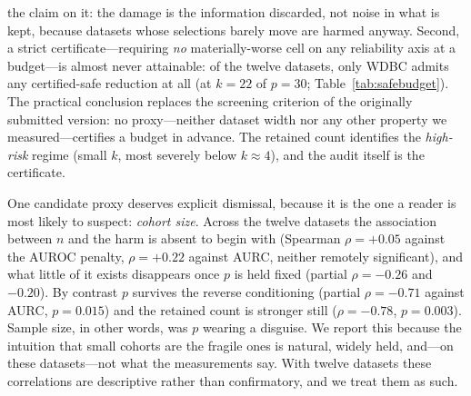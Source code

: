 \documentclass[fleqn,10pt]{wlscirep}
\newcommand{\result}[1]{#1}
\begin{document}
the claim on it: the damage is the information discarded, not noise in what is kept, because
datasets whose selections barely move are harmed anyway.
Second, a strict certificate---requiring \emph{no} materially-worse cell on any reliability axis at a
budget---is almost never attainable: of the twelve datasets, only WDBC admits any certified-safe
reduction at all (at $k=22$ of $p=30$; Table~\ref{tab:safebudget}). The practical conclusion
replaces the screening criterion of the originally submitted version: no proxy---neither dataset
width nor any other property we measured---certifies a budget in advance. The retained count
identifies the \emph{high-risk} regime (small $k$, most severely below $k\approx4$), and the audit
itself is the certificate.

One candidate proxy deserves explicit dismissal, because it is the one a reader is most likely to
suspect: \emph{cohort size}. Across the twelve datasets the association between $n$ and the harm is
absent to begin with (Spearman $\rho=\result{+0.05}$ against the AUROC penalty,
$\rho=\result{+0.22}$ against AURC, neither remotely significant), and what little of it exists
disappears once $p$ is held fixed (partial $\rho=\result{-0.26}$ and \result{$-0.20$}). By contrast
$p$ survives the reverse conditioning (partial $\rho=\result{-0.71}$ against AURC, $p=\result{0.015}$)
and the retained count is stronger still ($\rho=\result{-0.78}$, $p=\result{0.003}$). Sample size,
in other words, was $p$ wearing a disguise. We report this because the intuition that small cohorts
are the fragile ones is natural, widely held, and---on these datasets---not what the measurements
say. With twelve datasets these correlations are descriptive rather than confirmatory, and we treat
them as such.

\begin{table}[t]
\centering
\caption{What the fractional budgets actually retain. For each dataset: the candidate count $p$, the
retained count $k$ at the most aggressive budget, the AURC penalty there, its harm rank, and whether
the $\max(1,\cdot)$ floor is what produced that $k$. The two floor-collapsed datasets are the two
most harmed, which is why the harm must be related to $k$ rather than to $p$
(Section~\ref{sec:metasafe}); the exact-$k$ arm removes the confound entirely by evaluating every
dataset at the same $k$. Computed from the released per-configuration result summary.}
\label{tab:metak}

\end{table}

\begin{table}[t]
\centering
\caption{The strict safety certificate almost never passes. For each dataset, the smallest retained
count $k$ at which \emph{no} (ranker, learner) cell is materially worse than the full-feature model on
\emph{any} reliability axis (ECE, Brier, AURC, net benefit, conformal set size, AUROC), probing every
budget of both arms. Computed from the released per-configuration result summary.}
\label{tab:safebudget}

\end{table}
\end{document}
